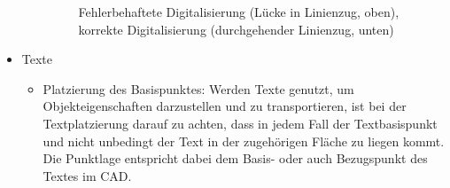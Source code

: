 \begin{itemize}
\begin{itemize}
\begin{figure}[h!tb]
			\caption{Fehlerbehaftete Digitalisierung (Lücke in Linienzug, oben), korrekte Digitalisierung (durchgehender Linienzug, unten)}
			\label{abb:vektor_lueckeLinie}
		\end{figure}	
	\end{itemize}
	\item Texte
	\begin{itemize}
		\item Platzierung des Basispunktes: Werden Texte genutzt, um Objekteigenschaften darzustellen und zu transportieren, ist bei der Textplatzierung darauf zu achten, dass in jedem Fall der Textbasispunkt und nicht unbedingt der Text in der zugehörigen Fläche zu liegen kommt. Die Punktlage entspricht dabei dem Basis- oder auch Bezugspunkt des Textes im CAD.
	\end{itemize}
\end{itemize}

